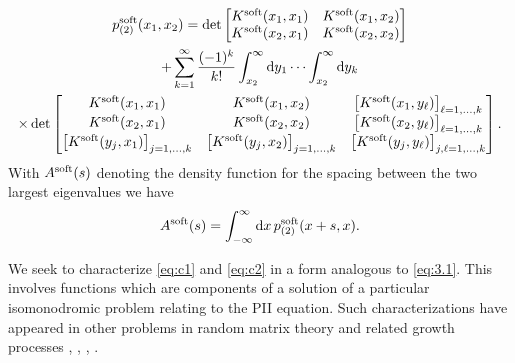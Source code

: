 \documentclass[10pt,reqno]{amsart}
\theoremstyle{plain}
\theoremstyle{definition}
\theoremstyle{remark}
\begin{document}
\begin{multline}
 p_{(2)}^{\rm soft}(x_1,x_2)  = \det 	\begin{bmatrix} K^{\rm soft}(x_1,x_1) &  K^{\rm soft}(x_1,x_2) \\
					  K^{\rm soft}(x_2,x_1) & K^{\rm soft}(x_2,x_2)  \end{bmatrix}  
\\
 + \sum_{k=1}^{\infty} \frac{ (-1)^k}{k!} \int_{x_2}^{\infty} {\rm d}y_1 \cdots \int_{x_2}^{\infty} {\rm d}y_k  
\\ \times
   \det \begin{bmatrix} K^{\rm soft}(x_1,x_1) &  K^{\rm soft}(x_1,x_2)  & \left[ K^{\rm soft}(x_1,y_{\ell}) \right]_{\ell=1,\ldots,k}  \\
		K^{\rm soft}(x_2,x_1) &  K^{\rm soft}(x_2,x_2)  & \left[ K^{\rm soft}(x_2,y_{\ell}) \right]_{\ell=1,\ldots,k}  \\
		\left[ K^{\rm soft}(y_j,x_1) \right]_{j=1,\ldots,k}  & \left[ K^{\rm soft}(y_j,x_2) \right]_{j=1,\ldots,k} & \left[ K^{\rm soft}(y_j,y_{\ell}) \right]_{j,\ell=1,\ldots,k}
	\end{bmatrix} .   
\label{eq:c1} 
\end{multline}
With  $A^{\rm soft}(s)$ denoting the density function for the spacing between the two largest eigenvalues we have 
\begin{equation}
A^{\rm soft}(s) = \int_{- \infty}^{\infty} {\rm d}x \, p^{\rm soft}_{(2)}(x+s,x). 		 \label{eq:c2}
\end{equation}   
					  
We seek to characterize \eqref{eq:c1} and \eqref{eq:c2} in a form analogous to \eqref{eq:3.1}. This involves functions which are components of a solution 
of a particular isomonodromic problem relating to the PII equation. Such characterizations have appeared in other problems in random matrix 
theory and related growth processes \cite{BR_2000}, \cite{FW_2007}, \cite{CIK_2010}, \cite{S_2012}. 
\end{document}
